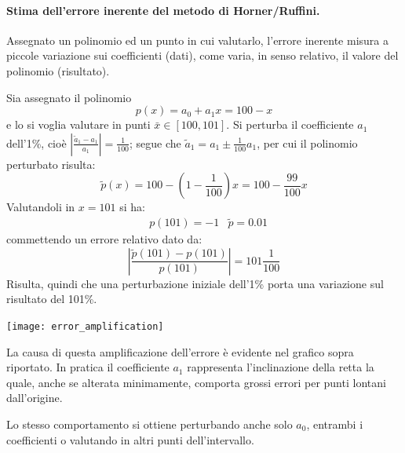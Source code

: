 \documentclass{article}
\begin{document}
\paragraph{Stima dell'errore inerente del metodo di Horner/Ruffini.} Assegnato
un polinomio ed un punto in cui valutarlo, l'errore inerente misura a piccole
variazione sui coefficienti (dati), come varia, in senso relativo, il valore
del polinomio (risultato). 
\begin{example}
    Sia assegnato il polinomio
    $$p(x)=a_0+a_1x=100-x$$
    e lo si voglia valutare in punti $\bar{x}\in[100,101]$. Si perturba il
    coefficiente $a_1$ dell'1\%, cioè $\left\lvert
    \frac{\tilde{a}_1-a_1}{a_1}\right\rvert=\frac{1}{100}$; segue che
    $\tilde{a}_1=a_1\pm \frac{1}{100}a_1$, per cui il polinomio perturbato
    risulta:
    $$\tilde{p}(x)=100-(1-\frac{1}{100})x=100-\frac{99}{100}x$$
    Valutandoli in $x=101$ si ha:
    \begin{equation*}
       \begin{aligned}
           & p(101)=-1 & \tilde{p}=0.01
       \end{aligned} 
    \end{equation*}
    commettendo un errore relativo dato da:
    $$\left\lvert \frac{\tilde{p}(101)-p(101)}{p(101)}\right\rvert=101\frac{1}{100}$$
    Risulta, quindi che una perturbazione iniziale dell'1\% porta una
    variazione sul risultato del 101\%.
    
    \begin{center}
        \texttt{[image: error\_amplification]}
    \end{center}

    La causa di questa amplificazione dell'errore è evidente nel grafico sopra 
    riportato. In pratica il coefficiente $a_1$ rappresenta l'inclinazione
    della retta la quale, anche se alterata minimamente, comporta grossi
    errori per punti lontani dall'origine. 
    
    Lo stesso comportamento si ottiene perturbando anche solo $a_0$, entrambi
    i coefficienti o valutando in altri punti dell'intervallo.


\end{example}
\end{document}
